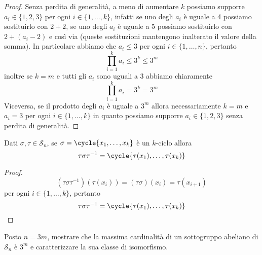 \documentclass[11pt]{scrartcl}
\begin{document}
	\begin{proof}
		Senza perdita di generalità, a meno di aumentare $k$ possiamo supporre
		$a_i \in \{1, 2, 3\}$ per ogni $i \in \{1, \ldots, k\}$, infatti se 
		uno degli $a_i$ è uguale a 4 possiamo sostituirlo con $2 + 2$, se uno degli
		$a_i$ è uguale a 5 possiamo sostituirlo con $2 + (a_i - 2)$ e così via
		(queste sostituzioni mantengono inalterato il valore della somma).
		In particolare abbiamo che $a_i \leqslant 3$ per ogni $i \in \{1, \ldots, n\}$,
		pertanto 
		\[
		\prod_{i = 1}^k a_i \leq 3^k \leq 3^m
		\]
		inoltre se $k = m$ e tutti gli $a_i$ sono uguali a 3 abbiamo chiaramente
		\[
		\prod_{i = 1}^k a_i = 3^k = 3^m
		\]
		Viceversa, se il prodotto degli $a_i$ è uguale a $3^m$ allora necessariamente
		$k = m$ e $a_i = 3$ per ogni $i \in \{1, \ldots, k\}$ in quanto possiamo
		supporre $a_i \in \{1, 2, 3\}$ senza perdita di generalità.
	\end{proof}
	
	\begin{lemma}
		\label{lemma1.56}
		Dati $\sigma, \tau \in \mathcal{S}_n$, se $\sigma = \cycle{x_1, \ldots, x_k}$ è un 
		$k$-ciclo allora 
		\[
		\tau\sigma\tau^{-1} = \cycle{\tau(x_1),\ldots, \tau(x_k)}
		\]
	\end{lemma}
	
	\begin{proof}
		\[
		(\tau\sigma\tau^{-1})(\tau(x_i)) = (\tau\sigma)(x_i) = \tau(x_{i + 1})
		\]per ogni $i \in \{1, \ldots, k\}$, pertanto
		\[
		\tau\sigma\tau^{-1} = \cycle{\tau(x_1), \ldots, \tau(x_k)}
		\]
	\end{proof}
	
	
	\begin{exercise}
		Posto $n = 3m$, mostrare che la massima cardinalità di un sottogruppo
		abeliano di $\mathcal{S}_n$ è $3^m$ e caratterizzare la sua classe di isomorfismo.
	\end{exercise}
	
\end{document}

